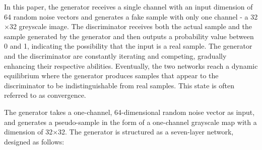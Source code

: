 \documentclass[journal]{IEEEtai}
\begin{document}
In this paper, the generator receives a single channel with an input dimension of 64 random noise vectors and generates a fake sample with only one channel - a 32$\times$32 greyscale image.
The discriminator receives both the actual sample and the sample generated by the generator and then outputs a probability value between 0 and 1, indicating the possibility that the input is a real sample.
The generator and the discriminator are constantly iterating and competing, gradually enhancing their respective abilities.
Eventually, the two networks reach a dynamic equilibrium where the generator produces samples that appear to the discriminator to be indistinguishable from real samples.
This state is often referred to as convergence.


The generator takes a one-channel, 64-dimensional random noise vector as input, and generates a pseudo-sample in the form of a one-channel grayscale map with a dimension of 32$\times$32. 
The generator is structured as a seven-layer network, designed as follows:
\end{document}
